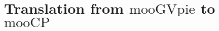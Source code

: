 \documentclass[orivec,envcountsame]{llncs}
\makeatletter
\newcommand{\gvout}[2]{{!#1.#2}}
\newcommand{\outterm}{\mathrm{end}_!}
\newcommand{\gvservice}[1]{\sharp #1}
\newcommand{\gvtyp}[3]{#1 \vdash #2 : #3}
\newcommand{\mkwd}[1]{\mathsf{#1}}
\newcommand{\cut}[4]{\mkwd{new}\:#1 \: (#3 \mid #4)}
\newcommand{\corec}[5]{\mkwd{corec}\:#1 \langle #2 \rangle (#4,#5)}
\newcommand{\gvsend}[2]{\mkwd{send}\:#1\:#2}
\newcommand{\gvreceive}[1]{\mkwd{receive}\:#1}
\newcommand{\gvlet}[3]{\mkwd{let}\;#1 = #2\;\mkwd{in}\;#3}
\newcommand{\gvfork}[2]{\mkwd{fork}\:#1.#2}
\newcommand{\gvletrec}[3]{\mkwd{corec}\:#1 = #2\:\mkwd{in}\:#3}
\newcommand{\gvrequest}[1]{\mkwd{request}\:#1}
\newcommand{\key}{\mkwd}
\newcommand{\tocp}[1]{\llbracket #1 \rrbracket}
\newcommand{\mucp}{$\mathrm{mooCP}$\xspace}
\newcommand{\gvpi}{$\mathrm{mooGVpie}$\xspace}
\newcommand{\ba}{\begin{array}}
\newcommand{\ea}{\end{array}}
\newcommand{\bl}{\ba[t]{@{}l@{}}}
\newcommand{\el}{\ea}
\newcommand{\todo}[1]{{\noindent\small\color{red} \framebox{\parbox{\dimexpr\linewidth-2\fboxsep-2\fboxrule}{\textbf{TODO:} #1}}}}
\makeatother
\begin{document}






\section{Translation from \gvpi to \mucp}

\end{document}
